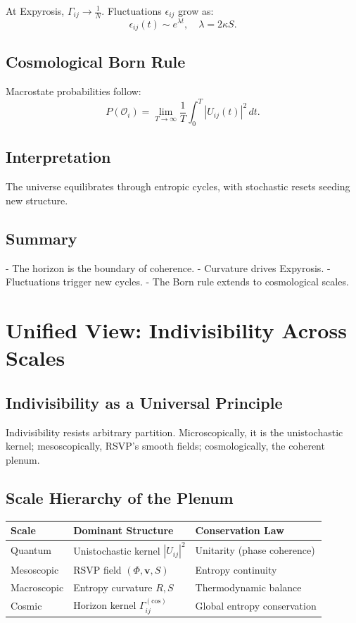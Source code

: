 \documentclass[12pt]{article}
\begin{document}
At Expyrosis, \(\Gamma_{ij} \to \frac{1}{N}\). Fluctuations \(\epsilon_{ij}\) grow as:
\[
\epsilon_{ij}(t) \sim e^{\lambda t}, \quad \lambda = 2 \kappa S.
\]

\subsection{Cosmological Born Rule}

Macrostate probabilities follow:
\[
P(\mathcal{O}_i) = \lim_{T \to \infty} \frac{1}{T} \int_0^T |U_{ij}(t)|^2 \, dt.
\]

\subsection{Interpretation}

The universe equilibrates through entropic cycles, with stochastic resets seeding new structure.

\subsection{Summary}

- The horizon is the boundary of coherence.
- Curvature drives Expyrosis.
- Fluctuations trigger new cycles.
- The Born rule extends to cosmological scales.

\section{Unified View: Indivisibility Across Scales}

\subsection{Indivisibility as a Universal Principle}

Indivisibility resists arbitrary partition. Microscopically, it is the unistochastic kernel; mesoscopically, RSVP’s smooth fields; cosmologically, the coherent plenum.

\subsection{Scale Hierarchy of the Plenum}

\begin{center}
\begin{tabular}{@{}lll@{}}
\toprule
\textbf{Scale} & \textbf{Dominant Structure} & \textbf{Conservation Law} \\
\midrule
Quantum & Unistochastic kernel \(|U_{ij}|^2\) & Unitarity (phase coherence) \\
Mesoscopic & RSVP field \((\Phi, \mathbf{v}, S)\) & Entropy continuity \\
Macroscopic & Entropy curvature \(R, S\) & Thermodynamic balance \\
Cosmic & Horizon kernel \(\Gamma_{ij}^{(\mathrm{cos})}\) & Global entropy conservation \\
\bottomrule
\end{tabular}
\end{center}
\end{document}
